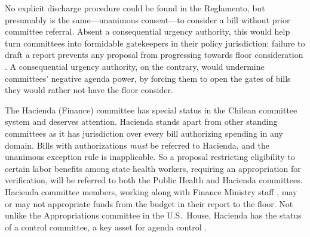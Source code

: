 \documentclass[letter,12pt]{article}
\begin{document}
No explicit discharge procedure could be found in the Reglamento, but presumably is the same---unanimous consent---to consider a bill without prior committee referral. Absent a consequential urgency authority, this would help turn committees into formidable gatekeepers in their policy jurisdiction: failure to draft a report prevents any proposal from progressing towards floor consideration \citep{cox.mccubbins.1993,fenno.1973,shepsle.weingast.1987}. A consequential urgency authority, on the contrary, would undermine committees' negative agenda power, by forcing them to open the gates of bills they would rather not have the floor consider. 

The Hacienda (Finance) committee has special status in the Chilean committee system and deserves attention. Hacienda stands apart from other standing committees as it has jurisdiction over every bill authorizing spending in any domain. Bills with authorizations \emph{must} be referred to Hacienda, and the unanimous exception rule is inapplicable. So a proposal restricting eligibility to certain labor benefits among state health workers, requiring an appropriation for verification, will be referred to both the Public Health and Hacienda committees. Hacienda committee members, working along with Finance Ministry staff \citep{aleman.navia.UrgChi.2009}, may or may not appropriate funds from the budget in their report to the floor. Not unlike the Appropriations committee in the U.S.\ House, Hacienda has the status of a control committee, a key asset for agenda control \citep{kiewiet.mccubbins.1991}. 




\end{document}
